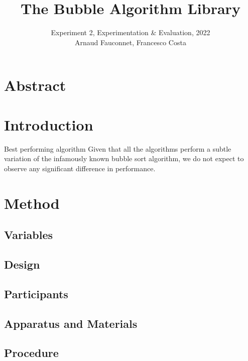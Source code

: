 \documentclass{article}
\title{The Bubble Algorithm Library}
\author{Experiment 2, Experimentation \& Evaluation, 2022\\Arnaud Fauconnet,
	Francesco Costa}
\date{}
\begin{document}
\maketitle
\tableofcontents

\section*{Abstract}


\section{Introduction}



\begin{Hypotheses*}{Best performing algorithm}{}
	Given that all the algorithms perform a subtle variation of the infamously
	known bubble sort algorithm, we do not expect to observe any significant
	difference in performance.
\end{Hypotheses*}

\section{Method}
\subsection{Variables}

\begin{description}
	\item[] 
\end{description}


\subsection{Design}


\subsection{Participants}

\subsection{Apparatus and Materials}
\label{apparatus}

\subsection{Procedure}
\end{document}

